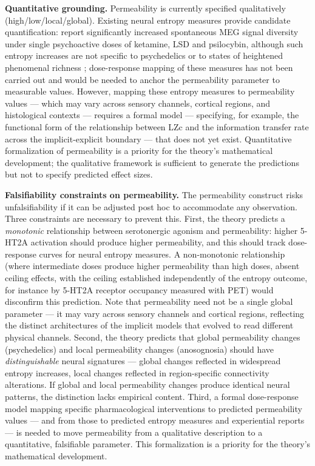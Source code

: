 \documentclass[12pt]{article}
\newcommand{\revstart}{}
\newcommand{\revend}{}
\begin{document}
\begin{sloppypar}
\textbf{Quantitative grounding.} Permeability is currently specified qualitatively (high/low/local/global). Existing neural entropy measures provide candidate quantification: \citet{Schartner2017} report significantly increased spontaneous MEG signal diversity under single psychoactive doses of ketamine, LSD and psilocybin, although such entropy increases are not specific to psychedelics or to states of heightened phenomenal richness \citep{Moses2026}; dose-response mapping of these measures has not been carried out and would be needed to anchor the permeability parameter to measurable values. However, mapping these entropy measures to permeability values --- which may vary across sensory channels, cortical regions, and histological contexts --- requires a formal model --- specifying, for example, the functional form of the relationship between LZc and the information transfer rate across the implicit-explicit boundary --- that does not yet exist. Quantitative formalization of permeability is a priority for the theory's mathematical development; the qualitative framework is sufficient to generate the predictions but not to specify predicted effect sizes.
\end{sloppypar}

{\revstart\textbf{Falsifiability constraints on permeability.} The permeability construct risks unfalsifiability if it can be adjusted post hoc to accommodate any observation. Three constraints are necessary to prevent this. First, the theory predicts a \emph{monotonic} relationship between serotonergic agonism and permeability: higher 5-HT2A activation should produce higher permeability, and this should track dose-response curves for neural entropy measures. A non-monotonic relationship (where intermediate doses produce higher permeability than high doses, absent ceiling effects, with the ceiling established independently of the entropy outcome, for instance by 5-HT2A receptor occupancy measured with PET) would disconfirm this prediction. Note that permeability need not be a single global parameter --- it may vary across sensory channels and cortical regions, reflecting the distinct architectures of the implicit models that evolved to read different physical channels. Second, the theory predicts that global permeability changes (psychedelics) and local permeability changes (anosognosia) should have \emph{distinguishable} neural signatures --- global changes reflected in widespread entropy increases, local changes reflected in region-specific connectivity alterations. If global and local permeability changes produce identical neural patterns, the distinction lacks empirical content. Third, a formal dose-response model mapping specific pharmacological interventions to predicted permeability values --- and from those to predicted entropy measures and experiential reports --- is needed to move permeability from a qualitative description to a quantitative, falsifiable parameter. This formalization is a priority for the theory's mathematical development.\revend}
\end{document}
